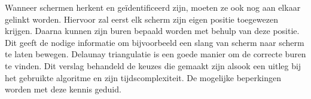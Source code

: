 Wanneer schermen herkent en geïdentificeerd zijn, moeten ze ook nog aan elkaar gelinkt worden. Hiervoor zal eerst elk scherm zijn eigen positie toegewezen krijgen. Daarna kunnen zijn buren bepaald worden met behulp van deze positie. Dit geeft de nodige informatie om bijvoorbeeld een slang van scherm naar scherm te laten bewegen. Delaunay triangulatie is een goede manier om de correcte buren te vinden. Dit verslag behandeld de keuzes die gemaakt zijn alsook een uitleg bij het gebruikte algoritme en zijn tijdscomplexiteit. De mogelijke beperkingen worden met deze kennis geduid.